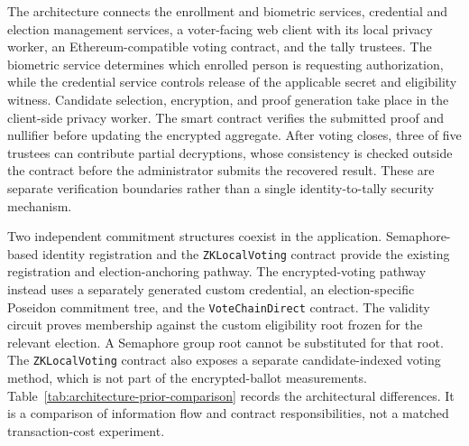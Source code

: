 The architecture connects the enrollment and biometric services, credential
and election management services, a voter-facing web client with its local
privacy worker, an Ethereum-compatible voting contract, and the tally
trustees. The biometric service determines which enrolled person is
requesting authorization, while the credential service controls release of
the applicable secret and eligibility witness. Candidate selection,
encryption, and proof generation take place in the client-side privacy
worker. The smart contract verifies the submitted proof and nullifier before
updating the encrypted aggregate. After voting closes, three of five
trustees can contribute partial decryptions, whose consistency is checked
outside the contract before the administrator submits the recovered result.
These are separate verification boundaries rather than a single
identity-to-tally security mechanism.

Two independent commitment structures coexist in the application.
Semaphore-based identity registration and the \texttt{ZKLocalVoting}
contract provide the existing registration and election-anchoring pathway.
The encrypted-voting pathway instead uses a separately generated custom
credential, an election-specific Poseidon commitment tree, and the
\texttt{VoteChainDirect} contract. The validity circuit proves membership
against the custom eligibility root frozen for the relevant election. A
Semaphore group root cannot be substituted for that root. The
\texttt{ZKLocalVoting} contract also exposes a separate candidate-indexed
voting method, which is not part of the encrypted-ballot measurements.
Table~\ref{tab:architecture-prior-comparison} records the architectural
differences. It is a comparison of information flow and contract
responsibilities, not a matched transaction-cost experiment.

